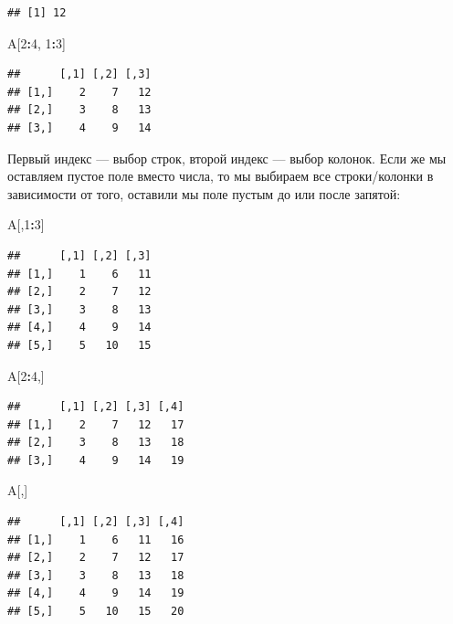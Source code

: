 \documentclass[]{book}
\newenvironment{Shaded}{\begin{snugshade}}{\end{snugshade}}
\newcommand{\DecValTok}[1]{\textcolor[rgb]{0.00,0.00,0.81}{#1}}
\newcommand{\NormalTok}[1]{#1}
\newcommand{\OperatorTok}[1]{\textcolor[rgb]{0.81,0.36,0.00}{\textbf{#1}}}
\begin{document}
\begin{verbatim}
## [1] 12
\end{verbatim}

\begin{Shaded}
\begin{Highlighting}[]
\NormalTok{A[}\DecValTok{2}\OperatorTok{:}\DecValTok{4}\NormalTok{, }\DecValTok{1}\OperatorTok{:}\DecValTok{3}\NormalTok{]}
\end{Highlighting}
\end{Shaded}

\begin{verbatim}
##      [,1] [,2] [,3]
## [1,]    2    7   12
## [2,]    3    8   13
## [3,]    4    9   14
\end{verbatim}

Первый индекс --- выбор строк, второй индекс --- выбор колонок. Если же мы оставляем пустое поле вместо числа, то мы выбираем все строки/колонки в зависимости от того, оставили мы поле пустым до или после запятой:

\begin{Shaded}
\begin{Highlighting}[]
\NormalTok{A[,}\DecValTok{1}\OperatorTok{:}\DecValTok{3}\NormalTok{]}
\end{Highlighting}
\end{Shaded}

\begin{verbatim}
##      [,1] [,2] [,3]
## [1,]    1    6   11
## [2,]    2    7   12
## [3,]    3    8   13
## [4,]    4    9   14
## [5,]    5   10   15
\end{verbatim}

\begin{Shaded}
\begin{Highlighting}[]
\NormalTok{A[}\DecValTok{2}\OperatorTok{:}\DecValTok{4}\NormalTok{,]}
\end{Highlighting}
\end{Shaded}

\begin{verbatim}
##      [,1] [,2] [,3] [,4]
## [1,]    2    7   12   17
## [2,]    3    8   13   18
## [3,]    4    9   14   19
\end{verbatim}

\begin{Shaded}
\begin{Highlighting}[]
\NormalTok{A[,]}
\end{Highlighting}
\end{Shaded}

\begin{verbatim}
##      [,1] [,2] [,3] [,4]
## [1,]    1    6   11   16
## [2,]    2    7   12   17
## [3,]    3    8   13   18
## [4,]    4    9   14   19
## [5,]    5   10   15   20
\end{verbatim}
\end{document}
